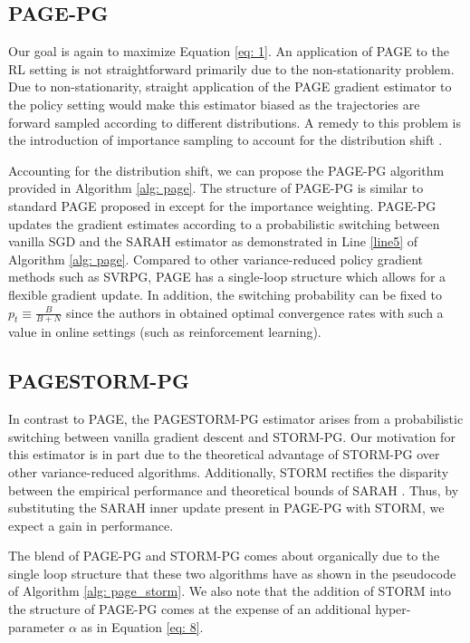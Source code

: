 \documentclass[10pt,twocolumn,letterpaper]{article}
\begin{document}
\subsection{PAGE-PG} \label{sec: pagepgsec}

Our goal is again to maximize Equation \ref{eq: 1}. An application of PAGE to the RL setting is not straightforward primarily due to the non-stationarity problem. Due to non-stationarity, straight application of the PAGE gradient estimator to the policy setting would make this estimator biased as the trajectories are forward sampled according to different distributions. A remedy to this problem is the introduction of importance sampling to account for the distribution shift \cite{importancesampling}. 

Accounting for the distribution shift, we can propose the PAGE-PG algorithm provided in Algorithm \ref{alg: page}. The structure of PAGE-PG is similar to standard PAGE proposed in \cite{pagepaper} except for the importance weighting. PAGE-PG updates the gradient estimates according to a probabilistic switching between vanilla SGD and the SARAH estimator as demonstrated in Line \ref{line5} of Algorithm \ref{alg: page}. Compared to other variance-reduced policy gradient methods such as SVRPG, PAGE has a single-loop structure which allows for a flexible gradient update. In addition, the switching probability can be fixed to $p_{t} \equiv \frac{B}{B+N}$ since the authors in \cite{pagepaper} obtained optimal convergence rates with such a value in online settings (such as reinforcement learning).


\subsection{PAGESTORM-PG} \label{sec: pagepgstorm}

In contrast to PAGE, the PAGESTORM-PG estimator arises from a probabilistic switching between vanilla gradient descent and STORM-PG. Our motivation for this estimator is in part due to the theoretical advantage of STORM-PG over other variance-reduced algorithms. Additionally, STORM rectifies the disparity between the empirical performance and theoretical bounds of SARAH \cite{stormpaper}. Thus, by substituting the SARAH inner update present in PAGE-PG with STORM, we expect a gain in performance.


The blend of PAGE-PG and STORM-PG comes about organically due to the single loop structure that these two algorithms have as shown in the pseudocode of Algorithm \ref{alg: page_storm}. We also note that the addition of STORM into the structure of PAGE-PG comes at the expense of an additional hyper-parameter $\alpha$ as in Equation \ref{eq: 8}. 
\end{document}
